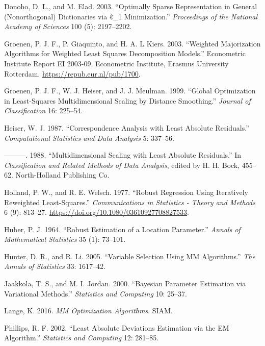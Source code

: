 \documentclass[
  12pt,
  letterpaper,
  DIV=11,
  numbers=noendperiod]{scrartcl}
\newlength{\cslhangindent}
\newenvironment{CSLReferences}[2] %
 {\begin{list}{}{%
  \setlength{\itemindent}{0pt}
  \setlength{\leftmargin}{0pt}
  \setlength{\parsep}{0pt}
  \ifodd #1
   \setlength{\leftmargin}{\cslhangindent}
   \setlength{\itemindent}{-1\cslhangindent}
  \fi
  \setlength{\itemsep}{#2\baselineskip}}}
 {\end{list}}
\theoremstyle{plain}
\theoremstyle{plain}
\theoremstyle{plain}
\theoremstyle{definition}
\theoremstyle{remark}
\begin{document}
\begin{CSLReferences}{1}{0}
Donoho, D. L., and M. Elad. 2003. {``Optimally Sparse Representation in
General (Nonorthogonal) Dictionaries via ℓ\_1 Minimization.''}
\emph{Proceedings of the National Academy of Sciences} 100 (5):
2197--2202.

Groenen, P. J. F., P. Giaquinto, and H. A. L Kiers. 2003. {``{Weighted
Majorization Algorithms for Weighted Least Squares Decomposition
Models}.''} Econometric Institute Report EI 2003-09. Econometric
Institute, Erasmus University Rotterdam.
\url{https://repub.eur.nl/pub/1700}.

Groenen, P. J. F., W. J. Heiser, and J. J. Meulman. 1999. {``{Global
Optimization in Least-Squares Multidimensional Scaling by Distance
Smoothing}.''} \emph{Journal of Classification} 16: 225--54.

Heiser, W. J. 1987. {``{Correspondence Analysis with Least Absolute
Residuals}.''} \emph{Computational Statistics and Data Analysis} 5:
337--56.

---------. 1988. {``{Multidimensional Scaling with Least Absolute
Residuals}.''} In \emph{Classification and Related Methods of Data
Analysis}, edited by H. H. Bock, 455--62. North-Holland Publishing Co.

Holland, P. W., and R. E. Welsch. 1977. {``Robust Regression Using
Iteratively Reweighted Least-Squares.''} \emph{Communications in
Statistics - Theory and Methods} 6 (9): 813--27.
\url{https://doi.org/10.1080/03610927708827533}.

Huber, P. J. 1964. {``Robust Estimation of a Location Parameter.''}
\emph{Annals of Mathematical Statistics} 35 (1): 73--101.

Hunter, D. R., and R. Li. 2005. {``{Variable Selection Using MM
Algorithms}.''} \emph{The Annals of Statistics} 33: 1617--42.

Jaakkola, T. S., and M. I. Jordan. 2000. {``{Bayesian Parameter
Estimation via Variational Methods}.''} \emph{Statistics and Computing}
10: 25--37.

Lange, K. 2016. \emph{MM Optimization Algorithms}. SIAM.

Phillips, R. F. 2002. {``Least Absolute Deviations Estimation via the EM
Algorithm.''} \emph{Statistics and Computing} 12: 281--85.


\end{CSLReferences}
\end{document}
